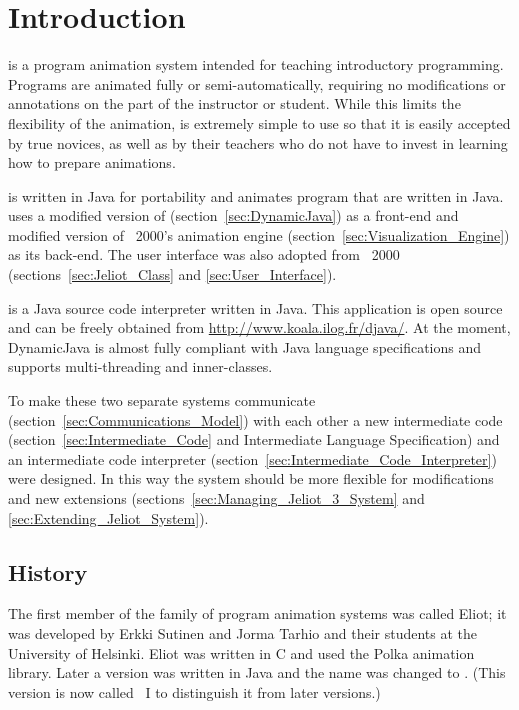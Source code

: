 \section{Introduction}
\label{sec:Introduction}

\jel{} is a program animation system intended for teaching introductory programming. Programs are animated fully or semi-automatically, requiring no modifications or annotations on the part of the instructor or student. While this limits the flexibility of the animation, \jel{} is extremely simple to use so that it is easily accepted by true novices, as well as by their teachers who do not have to invest in learning how to prepare animations.

\jel{} is written in Java for portability and animates program that are written in Java. \jel{} uses a modified version of \djava{} \citep{DJava} (section~\ref{sec:DynamicJava}) as a front-end and modified version of \jel{}~2000's animation engine (section~\ref{sec:Visualization_Engine}) as its back-end. The user interface was also adopted from \jel{}~2000 (sections~\ref{sec:Jeliot_Class} and \ref{sec:User_Interface}).

\djava{} is a Java source code interpreter written in Java. This application is open source and can be freely obtained from \url{http://www.koala.ilog.fr/djava/}. At the moment, DynamicJava is almost fully compliant with Java language specifications and supports multi-threading and inner-classes.

To make these two separate systems communicate (section~\ref{sec:Communications_Model}) with each other a new intermediate code (section~\ref{sec:Intermediate_Code} and Intermediate Language Specification) and an intermediate code interpreter (section~\ref{sec:Intermediate_Code_Interpreter}) were designed. In this way the system should be more flexible for modifications and new extensions (sections~\ref{sec:Managing_Jeliot_3_System} and \ref{sec:Extending_Jeliot_System}).

\subsection{History}

The first member of the \jel{} family of program animation systems was called Eliot; it was developed by Erkki Sutinen and Jorma Tarhio and their students at the University of Helsinki. Eliot was written in C and used the Polka animation library. Later a version was written in Java and the name was changed to \jel{}. (This version is now called \jel{}~I to distinguish it from later versions.)

